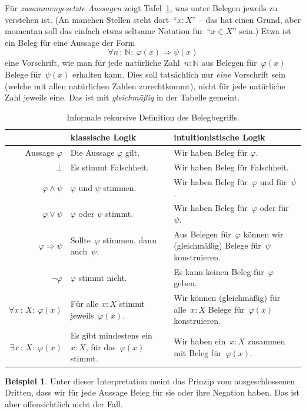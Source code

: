 \documentclass[a4paper,ngerman,12pt]{scrartcl}
\theoremstyle{definition}
\newtheorem{bsp}[defn]{Beispiel}
\theoremstyle{plain}
\theoremstyle{remark}
\newcommand{\NN}{\mathbb{N}}
\renewcommand{\_}{\mathpunct{.}\,}
\newcommand{\?}{\,{:}\,}
\begin{document}
Für \emph{zusammengesetzte Aussagen} zeigt Tafel~\ref{bhk}, was unter Belegen
jeweils zu verstehen ist. (An manchen Stellen steht dort~"`$x : X$"' -- das hat
einen Grund, aber momentan soll das einfach etwas seltsame Notation für~"`$x
\in X$"' sein.) Etwa ist ein Beleg für eine Aussage der Form
\[ \forall n \? \NN{:}\ \varphi(x) \Rightarrow \psi(x) \]
eine Vorschrift, wie man für jede natürliche Zahl~$n : \NN$ aus Belegen
für~$\varphi(x)$ Belege für~$\psi(x)$ erhalten kann. Dies soll tatsächlich nur
\emph{eine} Vorschrift sein (welche mit allen natürlichen Zahlen zurechtkommt),
nicht für jede natürliche Zahl jeweils eine. Das ist mit \emph{gleichmäßig} in
der Tabelle gemeint.

\begin{table}
  \centering
  \small
  \setlength{\extrarowheight}{0.3em}
  \begin{tabular}{@{}r|p{5.9cm}|p{6.5cm}@{}}
    & {klassische Logik} & {intuitionistische Logik}
    \\\hline
    Aussage $\varphi$ & Die Aussage $\varphi$ gilt. & Wir haben Beleg für $\varphi$. \\
    $\bot$ & Es stimmt Falschheit. & Wir haben Beleg für Falschheit. \\
    $\varphi \wedge \psi$ & $\varphi$ und $\psi$ stimmen. & Wir haben Beleg für~$\varphi$ und für~$\psi$. \\
    $\varphi \vee \psi$ & $\varphi$ oder $\psi$ stimmt. & Wir haben Beleg für~$\varphi$ oder für~$\psi$. \\
    $\varphi \Rightarrow \psi$ & Sollte~$\varphi$ stimmen, dann auch~$\psi$. &
    Aus Belegen für~$\varphi$ können wir (gleichmäßig) Belege für~$\psi$ konstruieren. \\
    $\neg\varphi$ &
      $\varphi$ stimmt nicht. &
      Es kann keinen Beleg für~$\varphi$ geben. \\
    $\forall x\?X{:}\ \varphi(x)$ & Für alle $x : X$ stimmt jeweils~$\varphi(x).$ &
      Wir können (gleichmäßig) für alle~$x : X$ Belege für~$\varphi(x)$ konstruieren. \\
    $\exists x\?X{:}\ \varphi(x)$ & \raggedright Es gibt mindestens ein~$x : X$, für das~$\varphi(x)$
    stimmt. & {\raggedright
      Wir haben ein~$x : X$ zusammen mit Beleg für~$\varphi(x).$}
  \end{tabular}
  \caption{\label{bhk}Informale rekursive Definition des Belegbegriffs.}
\end{table}

\begin{bsp}
Unter dieser Interpretation meint das Prinzip vom ausgeschlossenen Dritten, dass wir für jede
Aussage Beleg für sie oder ihre Negation haben. Das ist aber offensichtlich
nicht der Fall.
\end{bsp}
\end{document}
